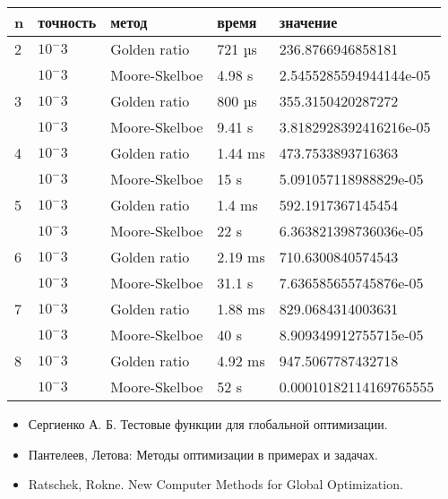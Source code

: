 \documentclass{article}
\begin{document}
    \begin{tabular}{ |p{2cm}|p{2cm}|p{3cm}|p{2cm}|p{4cm}|  }
        \hline
        n & точность & метод         & время   & значение               \\
        \hline
        2 & $10^-3$  & Golden ratio  & 721 µs  & 236.8766946858181      \\\cline{2-5}
        & $10^-3$  & Moore-Skelboe & 4.98 s  & 2.5455285594944144e-05 \\
        \hline
        3 & $10^-3$  & Golden ratio  & 800 µs  & 355.3150420287272      \\\cline{2-5}
        & $10^-3$  & Moore-Skelboe & 9.41 s  & 3.8182928392416216e-05 \\
        \hline
        4 & $10^-3$  & Golden ratio  & 1.44 ms & 473.7533893716363      \\\cline{2-5}
        & $10^-3$  & Moore-Skelboe & 15 s    & 5.091057118988829e-05  \\
        \hline
        5 & $10^-3$  & Golden ratio  & 1.4 ms  & 592.1917367145454      \\\cline{2-5}
        & $10^-3$  & Moore-Skelboe & 22 s    & 6.363821398736036e-05  \\
        \hline
        6 & $10^-3$  & Golden ratio  & 2.19 ms & 710.6300840574543      \\\cline{2-5}
        & $10^-3$  & Moore-Skelboe & 31.1 s  & 7.636585655745876e-05  \\
        \hline
        7 & $10^-3$  & Golden ratio  & 1.88 ms & 829.0684314003631      \\\cline{2-5}
        & $10^-3$  & Moore-Skelboe & 40 s    & 8.909349912755715e-05  \\
        \hline
        8 & $10^-3$  & Golden ratio  & 4.92 ms & 947.5067787432718      \\\cline{2-5}
        & $10^-3$  & Moore-Skelboe & 52 s    & 0.00010182114169765555 \\
        \hline

    \end{tabular}






    \newpage
    
    


    \begin{itemize}
        \item Сергиенко А. Б. Тестовые функции для глобальной оптимизации.
        \item Пантелеев, Летова: Методы оптимизации в примерах и задачах.
        \item Ratschek, Rokne. New Computer Methods for Global Optimization.

    \end{itemize}
\end{document}
